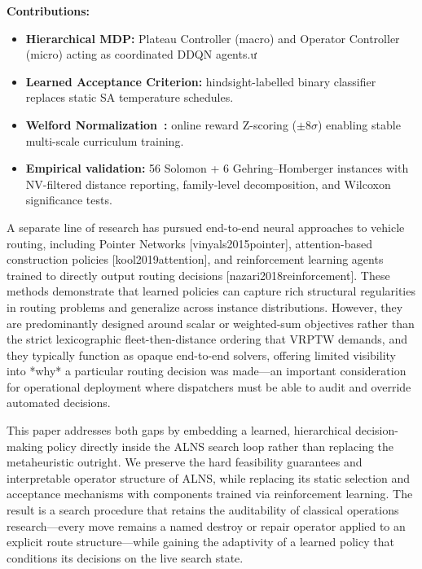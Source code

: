 \documentclass[conference]{IEEEtran}
\begin{document}
\textbf{Contributions:}
\begin{itemize}[leftmargin=1.2em,topsep=2pt]
  \item \textbf{Hierarchical MDP:} Plateau Controller (macro) and Operator
        Controller (micro) acting as coordinated DDQN agents.ư
  \item \textbf{Learned Acceptance Criterion:} hindsight-labelled binary
        classifier replaces static SA temperature schedules.
  \item \textbf{Welford Normalization~\cite{welford1962}:} online reward
        Z-scoring (${\pm}8\sigma$) enabling stable multi-scale curriculum training.
  \item \textbf{Empirical validation:} 56 Solomon + 6 Gehring--Homberger instances
        with NV-filtered distance reporting, family-level decomposition, and
        Wilcoxon significance tests.
\end{itemize}


A separate line of research has pursued end-to-end neural approaches to vehicle routing, including Pointer Networks [vinyals2015pointer], attention-based construction policies [kool2019attention], and reinforcement learning agents trained to directly output routing decisions [nazari2018reinforcement]. These methods demonstrate that learned policies can capture rich structural regularities in routing problems and generalize across instance distributions. However, they are predominantly designed around scalar or weighted-sum objectives rather than the strict lexicographic fleet-then-distance ordering that VRPTW demands, and they typically function as opaque end-to-end solvers, offering limited visibility into *why* a particular routing decision was made—an important consideration for operational deployment where dispatchers must be able to audit and override automated decisions.

This paper addresses both gaps by embedding a learned, hierarchical decision-making policy directly inside the ALNS search loop rather than replacing the metaheuristic outright. We preserve the hard feasibility guarantees and interpretable operator structure of ALNS, while replacing its static selection and acceptance mechanisms with components trained via reinforcement learning. The result is a search procedure that retains the auditability of classical operations research—every move remains a named destroy or repair operator applied to an explicit route structure—while gaining the adaptivity of a learned policy that conditions its decisions on the live search state.
\end{document}
